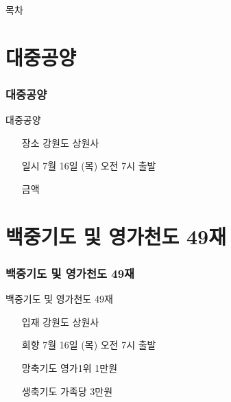 \documentclass[aspectratio=1610,10pt,xcolor=pdftex,dvipsnames,table,handout]{beamer}
\begin{document}
		\begin{frame} [plain]{목차}
		\tableofcontents%
		\end{frame}
		

	

	

		\section{대중공양}
		\begin{frame} [t,plain]
		\frametitle{대중공양}
			\begin{block} {대중공양 }
			\setlength{\leftmargini}{5em}			
			\begin{itemize}
				\item [장소]	 강원도 상원사
				\item [일시]	7월 16일 (목) 오전 7시 출발
				\item [금액]	
			\end{itemize}
			\end{block}						
		\end{frame}					

		\section{백중기도 및 영가천도 49재}
		\begin{frame} [t,plain]
		\frametitle{백중기도 및 영가천도 49재 }
			\begin{block} {백중기도 및 영가천도 49재 }

			\setlength{\leftmargini}{5em}			
			\begin{itemize}
				\item [입재]	 강원도 상원사
				\item [회향]	7월 16일 (목) 오전 7시 출발
				\item [망축기도]	영가1위 1만원
				\item [생축기도]	가족당 3만원
			\end{itemize}

			\end{block}						
		\end{frame}					




\end{document}
